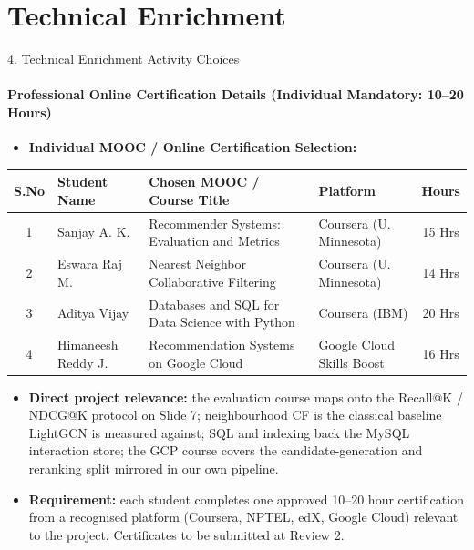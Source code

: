 \documentclass[aspectratio=169, 11pt]{beamer}
\begin{document}
\section{Technical Enrichment}

\begin{frame}{4. Technical Enrichment Activity Choices}
\framesubtitle{Professional Online Certification Details (Individual Mandatory: 10--20 Hours)}
    \begin{itemize}
        \item \textbf{Individual MOOC / Online Certification Selection:}
    \end{itemize}
    \vspace{-0.1cm}
    \begin{table}
        \centering
        \footnotesize
        \renewcommand{\arraystretch}{1.15}
        \begin{tabular}{|c|p{2.8cm}|p{4.4cm}|p{2.3cm}|c|}
            \hline
            \textbf{S.No} & \textbf{Student Name} & \textbf{Chosen MOOC / Course Title} & \textbf{Platform} & \textbf{Hours} \\
            \hline
            1 & Sanjay A. K. & Recommender Systems: Evaluation and Metrics & Coursera (U. Minnesota) & 15 Hrs \\
            \hline
            2 & Eswara Raj M. & Nearest Neighbor Collaborative Filtering & Coursera (U. Minnesota) & 14 Hrs \\
            \hline
            3 & Aditya Vijay & Databases and SQL for Data Science with Python & Coursera (IBM) & 20 Hrs \\
            \hline
            4 & Himaneesh Reddy J. & Recommendation Systems on Google Cloud & Google Cloud Skills Boost & 16 Hrs \\
            \hline
        \end{tabular}
    \end{table}
    \vspace{0.15cm}
    \begin{itemize}
        \item {\scriptsize \textbf{Direct project relevance:} the evaluation course maps onto the Recall@K / NDCG@K
        protocol on Slide 7; neighbourhood CF is the classical baseline LightGCN is measured against;
        SQL and indexing back the MySQL interaction store; the GCP course covers the candidate-generation
        and reranking split mirrored in our own pipeline.}
        \item {\scriptsize \textbf{Requirement:} each student completes one approved 10--20 hour certification from a
        recognised platform (Coursera, NPTEL, edX, Google Cloud) relevant to the project.
        Certificates to be submitted at Review 2.}
    \end{itemize}
\end{frame}
\end{document}
